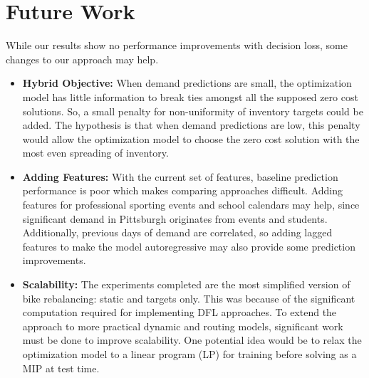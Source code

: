 \documentclass{article}
\begin{document}
\section{Future Work}
While our results show no performance improvements with decision loss, some changes to our approach may help.  
\begin{itemize}
    \item \textbf{Hybrid Objective:} When demand predictions are small, the optimization model has little information to break ties amongst all the supposed zero cost solutions. So, a small penalty for non-uniformity of inventory targets could be added. The hypothesis is that when demand predictions are low, this penalty would allow the optimization model to choose the zero cost solution with the most even spreading of inventory. 
    \item \textbf{Adding Features:} With the current set of features, baseline prediction performance is poor which makes comparing approaches difficult. Adding features for professional sporting events and school calendars may help, since significant demand in Pittsburgh originates from events and students. Additionally, previous days of demand are correlated, so adding lagged features to make the model autoregressive may also provide some prediction improvements.  
    \item \textbf{Scalability:} The experiments completed are the most simplified version of bike rebalancing: static and targets only. This was because of the significant computation required for implementing DFL approaches. To extend the approach to more practical dynamic and routing models, significant work must be done to improve scalability. One potential idea would be to relax the optimization model to a linear program (LP) for training before solving as a MIP at test time.
\end{itemize}




\newpage
 
  



\newpage
\appendix
\setcounter{algorithm}{0} 
\setcounter{table}{0}
\setcounter{figure}{0}
\renewcommand{\thealgorithm}{\Alph{section}\arabic{algorithm}}
\renewcommand{\thefigure}{\Alph{section}\arabic{figure}}
\renewcommand{\thetable}{\Alph{section}\arabic{table}}
\end{document}
